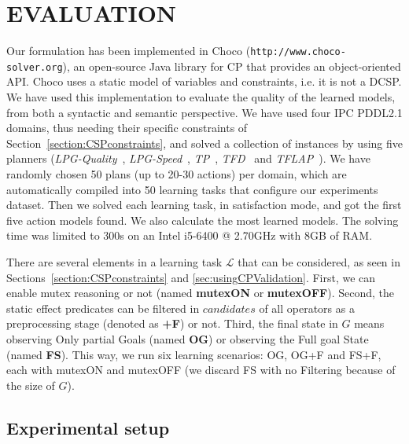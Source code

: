 \documentclass{ecai}
\begin{document}
  
\section{EVALUATION}
\label{sec:evaluation}

Our formulation has been implemented in \textsf{Choco} (\texttt{http://www.choco-solver.org}), an open-source Java library for CP that provides an object-oriented API. 
\textsf{Choco} uses a static model of variables and constraints, i.e. it is not a DCSP.
We have used this implementation to evaluate the quality of the learned models, from both a syntactic and semantic perspective. We have used four IPC PDDL2.1 domains, thus needing their specific constraints of Section~\ref{section:CSPconstraints}, and solved a collection of instances by using five planners (\textit{LPG-Quality}~\cite{gerevini2003planning}, \textit{LPG-Speed}~\cite{gerevini2003planning}, \textit{TP}~\cite{jimenez2015temporal}, \textit{TFD}~\cite{eyerich2009using} and \textit{TFLAP}~\cite{marzal2016temporal}).
We have randomly chosen 50 plans (up to 20-30 actions) per domain, which are automatically compiled into 50 learning tasks that configure our experiments dataset.
Then we solved each learning task, in satisfaction mode, and got the first five action models found. 
We also calculate the most learned models.
The solving time was limited to 300s on an Intel i5-6400 @ 2.70GHz with 8GB of RAM. 

There are several elements in a learning task $\mathcal{L}$ that can be considered, as seen in Sections~\ref{section:CSPconstraints} and \ref{sec:usingCPValidation}.
First, we can enable mutex reasoning or not (named \textbf{mutexON} or \textbf{mutexOFF}).
Second, the static effect predicates can be filtered in $candidates$ of all operators as a preprocessing stage (denoted as \textbf{+F}) or not. 
Third, the final state in $G$ means observing Only partial Goals (named \textbf{OG}) or observing the Full goal State (named \textbf{FS}). 
This way, we run six learning scenarios: OG, OG+F and FS+F, each with mutexON and mutexOFF (we discard FS with no Filtering because of the size of $G$).




\subsection{Experimental setup}
\end{document}
